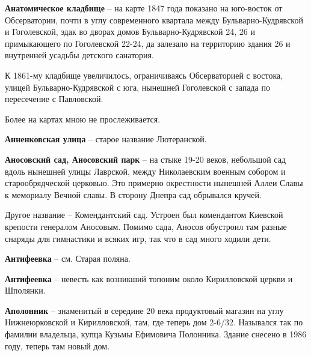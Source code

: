 \medskip


\textbf{Анатомическое кладбище} – на карте 
1847 года показано на юго-восток от Обсерватории, почти в углу современного квартала между Бульварно-Кудрявской и Гоголевской, эдак во дворах домов Бульвар\-но-Кудрявской 24, 26 и примыкающего по Гоголевской 22-24, да залезало на территорию здания 26 и внутренней усадьбы детского санатория.

К 1861-му кладбище увеличилось, ограничиваясь Обсерваторией с востока, улицей Бульвар\-но-Кудрявской с юга, нынешней Гоголевской с запада по пересечение с Павловской.

Более на картах мною не прослеживается.\\
\medskip


\textbf{Анненковская улица} – старое название Лютеранской.\\

\medskip


\textbf{Аносовский сад, Аносовский парк} – на стыке 19-20 веков, небольшой сад вдоль нынешней улицы Лаврской, между Николаевским военным собором и старообрядческой церковью. Это примерно окрестности нынешней Аллеи Славы к мемориалу Вечной славы. В сторону Днепра сад обрывался кручей.

Другое название – Комендантский сад. Уст\-роен был комендантом Киевской крепости генералом Аносовым. Помимо сада, Аносов обустроил там разные снаряды для гимнастики и всяких игр, так что в сад много ходили дети.\\ 

\medskip


\textbf{Антифеевка} – см. Старая поляна.\\

\medskip


\textbf{Антифеевка} – невесть как возникший топоним около Кирилловской церкви и Шполянки.\\

\medskip



\textbf{Аполонник} – знаменитый в середине 20 века продуктовый магазин на углу Нижнеюрковской и Кирилловской, там, где теперь дом 2-6/32. Назывался так по фамилии владельца, купца Кузьмы Ефимовича Полонника. Здание снесено в 1986 году, теперь там новый дом.\\

